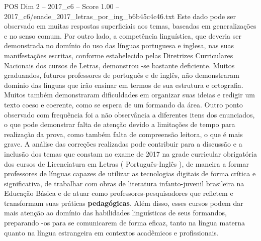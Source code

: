 \begin{textsample}{POS Dim 2 – 2017\_c6 – Score 1.00 – 2017\_c6/enade\_2017\_letras\_por\_ing\_b6b45c4c46.txt}
Este dado pode ser observado em muitas respostas superficiais aos temas, baseadas em generalizações e no senso comum.
Por outro lado, a competência linguística, que deveria ser demonstrada no domínio do uso das línguas portuguesa e inglesa, nas suas manifestações escritas, conforme estabelecido pelas Diretrizes Curriculares Nacionais dos cursos de Letras, demonstrou -se bastante deficiente.
Muitos graduandos, futuros professores de português e de inglês, não demonstraram domínio das línguas que irão ensinar em termos de sua estrutura e ortografia.
Muitos também demonstraram dificuldades em organizar suas ideias e redigir um texto coeso e coerente, como se espera de um formando da área.
Outro ponto observado com frequência foi a não observância a diferentes itens dos enunciados, o que pode demonstrar falta de atenção devido a limitações de tempo para realização da prova, como também falta de compreensão leitora, o que é mais grave.
A análise das correções realizadas pode contribuir para a discussão e a inclusão dos temas que constam no exame de 2017 na grade curricular obrigatória dos cursos de Licenciatura em Letras ( Português-Inglês ), de maneira a formar professores de línguas capazes de utilizar as tecnologias digitais de forma crítica e significativa, de trabalhar com obras de literatura infanto-juvenil brasileira na Educação Básica e de atuar como professores-pesquisadores que refletem e transformam suas práticas \textbf{pedagógicas}.
Além disso, esses cursos podem dar mais atenção ao domínio das habilidades linguísticas de seus formandos, preparando -os para se comunicarem de forma eficaz, tanto na língua materna quanto na língua estrangeira em contextos acadêmicos e profissionais.

\end{textsample}
